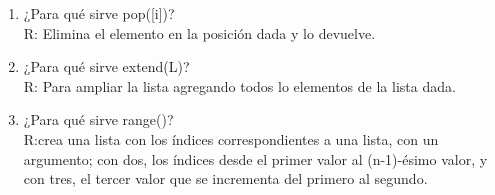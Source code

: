 \documentclass[etterpaper, 12pt, oneside]{article}%
\begin{document}
\begin{enumerate}
		
		\item ¿Para qué sirve pop([i])?
		\\R: Elimina el elemento en la posición dada y lo devuelve.
		
		
		\item ¿Para qué sirve extend(L)?
		\\R: Para ampliar la lista agregando todos lo elementos de la lista dada.
		
		
		\item ¿Para qué sirve range()?
		\\R:crea una lista con los índices correspondientes a una lista, con un argumento; con dos, los índices desde el primer valor al (n-1)-ésimo valor, y con tres, el tercer valor que se incrementa del primero al segundo.
		
		
	\end{enumerate}
	
\end{document}

